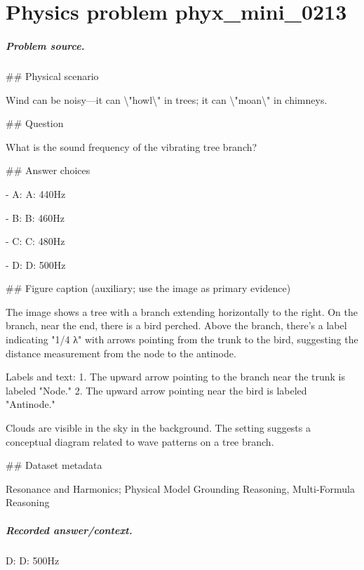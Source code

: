 
\chapter{Physics problem phyx\_mini\_0213}
\label{ch:PhyXMiniProblems_problem_phyx_mini_0213}

\paragraph{Problem source.}
\#\# Physical scenario

Wind can be noisy—it can \textbackslash{}"howl\textbackslash{}" in trees; it can \textbackslash{}"moan\textbackslash{}" in chimneys.

\#\# Question

What is the sound frequency of the vibrating tree branch?

\#\# Answer choices

- A: A: 440Hz

- B: B: 460Hz

- C: C: 480Hz

- D: D: 500Hz

\#\# Figure caption (auxiliary; use the image as primary evidence)

The image shows a tree with a branch extending horizontally to the right. On the branch, near the end, there is a bird perched. Above the branch, there's a label indicating "1/4 λ" with arrows pointing from the trunk to the bird, suggesting the distance measurement from the node to the antinode.

Labels and text:
1. The upward arrow pointing to the branch near the trunk is labeled "Node."
2. The upward arrow pointing near the bird is labeled "Antinode."
   
Clouds are visible in the sky in the background. The setting suggests a conceptual diagram related to wave patterns on a tree branch.

\#\# Dataset metadata

Resonance and Harmonics; Physical Model Grounding Reasoning, Multi-Formula Reasoning

\paragraph{Recorded answer/context.}
D: D: 500Hz

